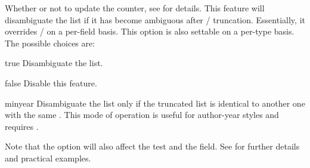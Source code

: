 \documentclass{ltxdockit}[2011/03/25]
\begin{document}
\begin{optionlist}
Whether or not to update the  counter, see  for details. This feature will disambiguate the  list if it has become ambiguous after \slash {} truncation. Essentially, it overrides \slash {} on a per-field basis. This option is also settable on a per-type basis. The possible choices are:

\begin{valuelist}
\item[true] Disambiguate the  list.
\item[false] Disable this feature.
\item[minyear] Disambiguate the  list only if the truncated list is identical to another one with the same . This mode of operation is useful for author-year styles and requires .
\end{valuelist}
%
Note that the  option will also affect the  test and the  field. See  for further details and practical examples.

\end{optionlist}
\end{document}
